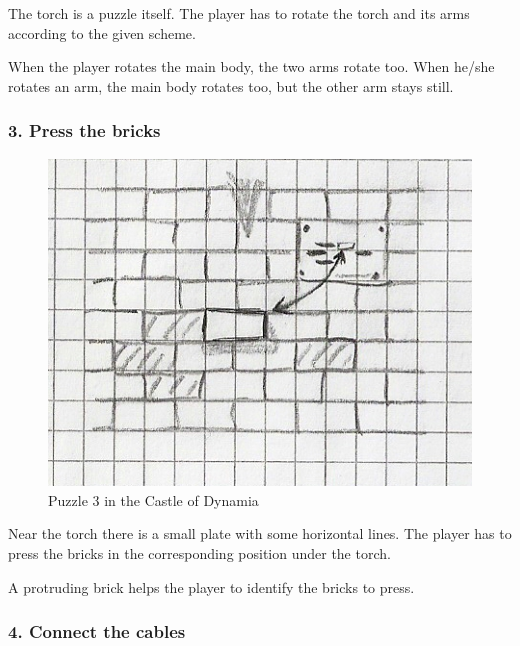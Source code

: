 The torch is a puzzle itself. The player has to rotate the torch and its arms according to the given scheme.

When the player rotates the main body, the two arms rotate too. When he/she rotates an arm, the main body rotates too, but the other arm stays still.

\subsubsection*{3. Press the bricks}

\begin{figure}[H]
  \centering
  \includegraphics[width=\textwidth]{Images/Puzzles/castleOfDynamia_3}
  \caption{Puzzle 3 in the Castle of Dynamia}
\end{figure}

Near the torch there is a small plate with some horizontal lines. The player has to press the bricks in the corresponding position under the torch.

A protruding brick helps the player to identify the bricks to press.

\subsubsection*{4. Connect the cables}

